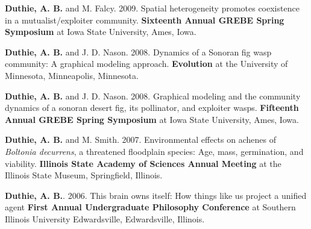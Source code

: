 \documentclass[letterpaper]{article}
\renewenvironment{itemize}{
  \begin{list}{}{
    \setlength{\leftmargin}{1.5em}
  }
}{
  \end{list}
}
\begin{document}
\begin{itemize}
\item {\bf Duthie, A. B.} and M. Falcy. 2009. Spatial heterogeneity promotes coexistence in a mutualist/exploiter community. {\bf Sixteenth Annual GREBE Spring Symposium} at Iowa State University, Ames, Iowa.
\item {\bf Duthie, A. B.} and J. D. Nason. 2008. Dynamics of a Sonoran fig wasp community: A graphical modeling approach. {\bf Evolution} at the University of Minnesota, Minneapolis, Minnesota.
\item {\bf Duthie, A. B.} and J. D. Nason. 2008. Graphical modeling and the community dynamics of a sonoran desert fig, its pollinator, and exploiter wasps. {\bf Fifteenth Annual GREBE Spring Symposium} at Iowa State University, Ames, Iowa.
\item {\bf Duthie, A. B.} and M. Smith. 2007. Environmental effects on achenes of {\it Boltonia decurrens}, a threatened floodplain species: Age, mass, germination, and viability. {\bf Illinois State Academy of Sciences Annual Meeting} at the Illinois State Museum, Springfield, Illinois.
\item {\bf Duthie, A. B.}. 2006. This brain owns itself: How things like us project a unified agent {\bf First Annual Undergraduate Philosophy Conference} at Southern Illinois University Edwardsville, Edwardsville, Illinois.
\end{itemize}
\end{document}
